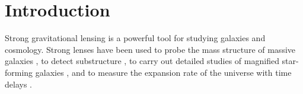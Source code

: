\documentclass{aa}
\begin{document}
   \maketitle
%

\section{Introduction}\label{sect:intro}

Strong gravitational lensing is a powerful tool for studying galaxies and cosmology.
Strong lenses have been used to probe the mass structure of massive galaxies \citep{Aug++10, ORF14, Son++15, Sha++21}, to detect substructure \citep{Veg++12, Hez++16, Nie++20}, to carry out detailed studies of magnified star-forming galaxies \citep{Jon++13}, and to measure the expansion rate of the universe with time delays \citep[see][ for a review]{T+M16}.
\end{document}

